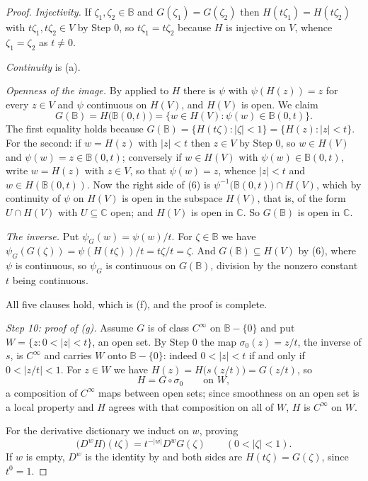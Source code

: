 \begin{proof}
\emph{Injectivity.}  If $\zeta_1,\zeta_2\in\mathbb{B}$ and
$G(\zeta_1)=G(\zeta_2)$ then $H(t\zeta_1)=H(t\zeta_2)$ with
$t\zeta_1,t\zeta_2\in V$ by Step 0, so $t\zeta_1=t\zeta_2$ because $H$ is
injective on $V$, whence $\zeta_1=\zeta_2$ as $t\neq0$.

\emph{Continuity} is (a).

\emph{Openness of the image.}  By  applied to $H$
there is $\psi$ with $\psi(H(z))=z$ for every $z\in V$ and $\psi$ continuous on
$H(V)$, and $H(V)$ is open.  We claim
\begin{equation}\tag{6}
  G(\mathbb{B})=H\bigl(\mathbb{B}(0,t)\bigr)
  =\bigl\{w\in H(V):\psi(w)\in\mathbb{B}(0,t)\bigr\}.
\end{equation}
The first equality holds because $G(\mathbb{B})=\{H(t\zeta):|\zeta|<1\}
=\{H(z):|z|<t\}$.  For the second: if $w=H(z)$ with $|z|<t$ then $z\in V$ by
Step 0, so $w\in H(V)$ and $\psi(w)=z\in\mathbb{B}(0,t)$; conversely if
$w\in H(V)$ with $\psi(w)\in\mathbb{B}(0,t)$, write $w=H(z)$ with $z\in V$, so
that $\psi(w)=z$, whence $|z|<t$ and $w\in H(\mathbb{B}(0,t))$.  Now the right
side of (6) is $\psi^{-1}\bigl(\mathbb{B}(0,t)\bigr)\cap H(V)$, which by
continuity of $\psi$ on $H(V)$ is open in the subspace $H(V)$, that is, of the
form $U\cap H(V)$ with $U\subseteq\mathbb{C}$ open; and $H(V)$ is open in
$\mathbb{C}$.  So $G(\mathbb{B})$ is open in $\mathbb{C}$.

\emph{The inverse.}  Put $\psi_G(w)=\psi(w)/t$.  For $\zeta\in\mathbb{B}$ we
have $\psi_G(G(\zeta))=\psi(H(t\zeta))/t=t\zeta/t=\zeta$.  And
$G(\mathbb{B})\subseteq H(V)$ by (6), where $\psi$ is continuous, so $\psi_G$ is
continuous on $G(\mathbb{B})$, division by the nonzero constant $t$ being
continuous.

All five clauses hold, which is (f), and the proof is complete.

\emph{Step 10: proof of (g).}  Assume $G$ is of class $C^\infty$ on
$\mathbb{B}-\{0\}$ and put $W=\{z:0<|z|<t\}$, an open set.  By Step 0 the map
$\sigma_0(z)=z/t$, the inverse of $s$, is $C^\infty$ and carries $W$ onto
$\mathbb{B}-\{0\}$: indeed $0<|z|<t$ if and only if $0<|z/t|<1$.  For $z\in W$
we have $H(z)=H\bigl(s(z/t)\bigr)=G(z/t)$, so
\[
  H=G\circ\sigma_0\qquad\text{on }W,
\]
a composition of $C^\infty$ maps between open sets; since smoothness on an open
set is a local property and $H$ agrees with that composition on all of $W$, $H$
is $C^\infty$ on $W$.

For the derivative dictionary we induct on $w$, proving
\begin{equation}\tag{6}
  \bigl(D^{w}H\bigr)(t\zeta)=t^{-|w|}D^{w}G(\zeta)
  \qquad(0<|\zeta|<1).
\end{equation}
If $w$ is empty, $D^{w}$ is the identity by  and both
sides are $H(t\zeta)=G(\zeta)$, since $t^{0}=1$.


\end{proof}
